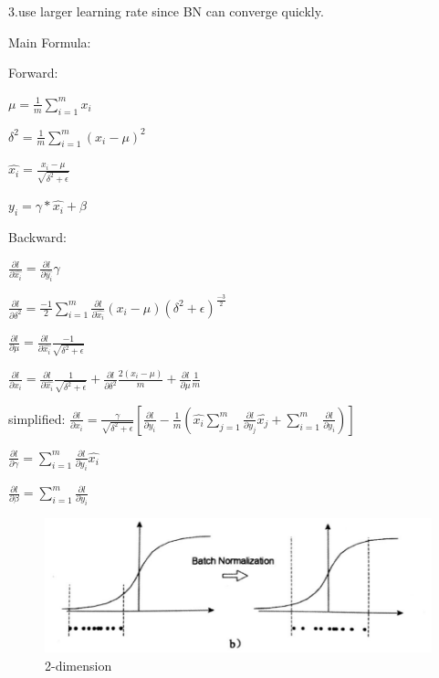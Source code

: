 \documentclass{article} %
\begin{document}
3.use larger learning rate since BN can converge quickly.

Main Formula:

Forward:
\begin{center}
${\displaystyle \mu = \frac{1}{m}\sum_{i=1}^{m}x_i}$

${\displaystyle \delta^2 = \frac{1}{m}\sum_{i=1}^{m}(x_i-\mu)^2}$

${\displaystyle \hat{x_i}=\frac{x_i-\mu}{\sqrt{\delta^2+\epsilon}}}$

${\displaystyle  y_i=\gamma*\hat{x_i}+\beta}$
\end{center}
Backward:
\begin{center}
${\displaystyle \frac{\partial l}{\partial \hat{x_i}} = \frac{\partial l}{\partial \hat{y_i}} \gamma}$

${\displaystyle \frac{\partial l}{\partial \delta^2} = \frac{-1}{2}\sum_{i=1}^{m}\frac{\partial l}{\partial \hat{x_i}}(x_i-\mu)(\delta^2+\epsilon)^{\frac{-3}{2}}}$

${\displaystyle \frac{\partial l}{\partial \mu} = \frac{\partial l}{\partial \hat{x_i}}\frac{-1}{\sqrt{\delta^2+\epsilon}}}$

${\displaystyle \frac{\partial l}{\partial x_i}=\frac{\partial l}{\partial \hat{x_i}}\frac{1}{\sqrt{\delta^2+\epsilon}}+\frac{\partial l}{\partial \delta^2}\frac{2(x_i-\mu)}{m}+\frac{\partial l}{\partial \mu}\frac{1}{m}
}$

simplified:
${\displaystyle \frac{\partial l}{\partial x_i}=\frac{\gamma}{\sqrt{\delta^2+\epsilon}}[\frac{\partial l}{\partial y_i}-\frac{1}{m}(\hat{x_i}\sum_{j=1}^{m}\frac{\partial l}{\partial y_j}\hat{x_j}+\sum_{i=1}^{m}\frac{\partial l}{\partial y_i})]
}$

${\displaystyle \frac{\partial l}{\partial \gamma}=\sum_{i=1}^{m}\frac{\partial l}{\partial y_i}\hat{x_i}}$

${\displaystyle \frac{\partial l}{\partial \beta}=\sum_{i=1}^{m}\frac{\partial l}{\partial y_i}}$
\end{center}

\begin{figure}[h]
	\centering  %
	\includegraphics[width=.4\textwidth]{2.png} 
	\caption{2-dimension}  %
	\label{fig:f2}   %
\end{figure}
\end{document}
